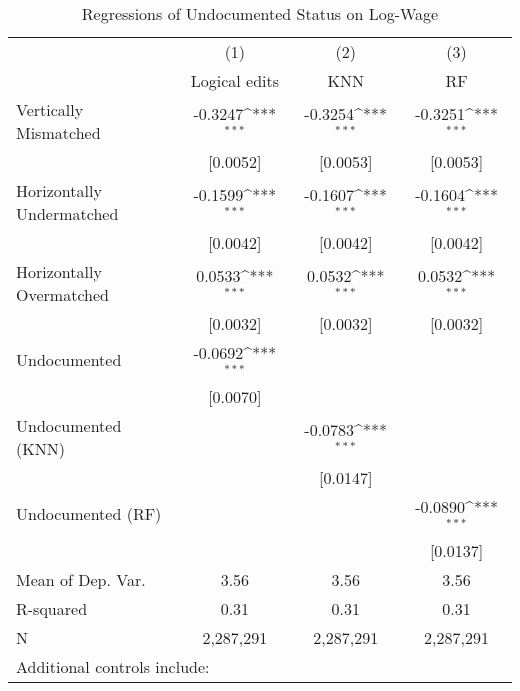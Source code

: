 \begin{table}[htbp]\centering
\def\sym#1{\ifmmode^{#1}\else\(^{#1}\)\fi}
\caption{Regressions of Undocumented Status on Log-Wage}
\begin{tabular}{l*{3}{c}}
\toprule
                    &\multicolumn{1}{c}{(1)}         &\multicolumn{1}{c}{(2)}         &\multicolumn{1}{c}{(3)}         \\
                    &Logical edits         &         KNN         &          RF         \\
\midrule
Vertically Mismatched&     -0.3247\sym{***}&     -0.3254\sym{***}&     -0.3251\sym{***}\\
                    &    [0.0052]         &    [0.0053]         &    [0.0053]         \\
\addlinespace
Horizontally Undermatched&     -0.1599\sym{***}&     -0.1607\sym{***}&     -0.1604\sym{***}\\
                    &    [0.0042]         &    [0.0042]         &    [0.0042]         \\
\addlinespace
Horizontally Overmatched&      0.0533\sym{***}&      0.0532\sym{***}&      0.0532\sym{***}\\
                    &    [0.0032]         &    [0.0032]         &    [0.0032]         \\
\addlinespace
Undocumented        &     -0.0692\sym{***}&                     &                     \\
                    &    [0.0070]         &                     &                     \\
\addlinespace
Undocumented (KNN)  &                     &     -0.0783\sym{***}&                     \\
                    &                     &    [0.0147]         &                     \\
\addlinespace
Undocumented (RF)   &                     &                     &     -0.0890\sym{***}\\
                    &                     &                     &    [0.0137]         \\
\midrule
Mean of Dep. Var.   &        3.56         &        3.56         &        3.56         \\
R-squared           &        0.31         &        0.31         &        0.31         \\
N                   &   2,287,291         &   2,287,291         &   2,287,291         \\
\bottomrule
\multicolumn{4}{l}{\footnotesize Additional controls include:}\\

\end{tabular}
\end{table}
